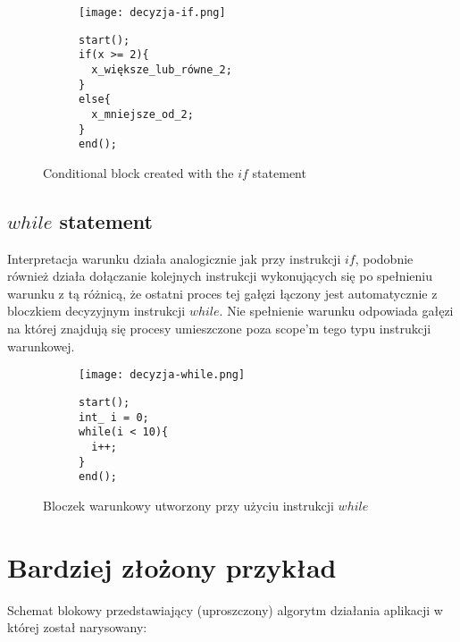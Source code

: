\begin{figure}[H]
  \begin{subfigure}[t]{0.49\textwidth}
    \vspace{0pt}
    \texttt{[image: decyzja-if.png]}
  \end{subfigure}\hfill
  \begin{subfigure}[t]{0.44\textwidth}
    \begin{verbatim}
start();
if(x >= 2){
  x_większe_lub_równe_2;
}
else{
  x_mniejsze_od_2;
}
end();
    \end{verbatim}
  \end{subfigure}%
  \caption{Conditional block created with the $if$ statement}
\end{figure}

		\subsection { $while$ statement } 
	
		Interpretacja warunku działa analogicznie jak przy instrukcji $if$, podobnie również działa dołączanie kolejnych instrukcji wykonujących się po spełnieniu warunku z tą różnicą, że ostatni proces tej gałęzi łączony jest automatycznie z bloczkiem decyzyjnym instrukcji $while$. Nie spełnienie warunku odpowiada gałęzi na której znajdują się procesy umieszczone poza scope'm  tego typu instrukcji warunkowej.
	
				\begin{figure}[H]
  \begin{subfigure}[t]{0.49\textwidth}
    \vspace{0pt}
    \texttt{[image: decyzja-while.png]}
  \end{subfigure}\hfill
  \begin{subfigure}[t]{0.44\textwidth}
    \begin{verbatim}
start();
int_ i = 0;
while(i < 10){
  i++;
}
end();
    \end{verbatim}
  \end{subfigure}%
  \caption{Bloczek warunkowy utworzony przy użyciu instrukcji $while$}
\end{figure}	

\section{Bardziej złożony przykład}
Schemat blokowy przedstawiający (uproszczony) algorytm działania aplikacji w której został narysowany: {\smallskip}

